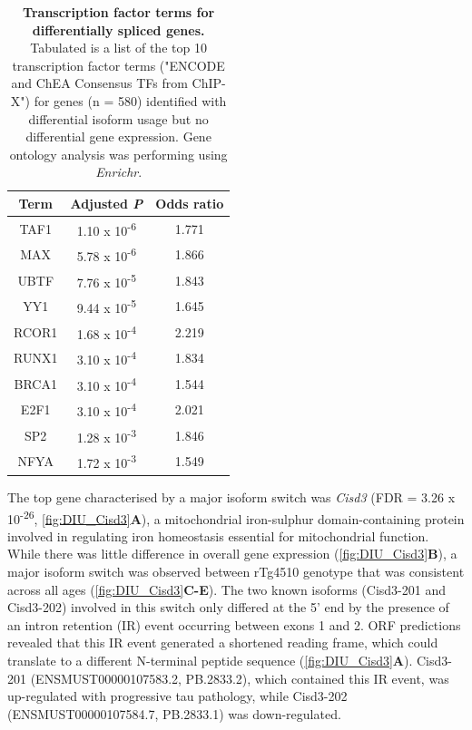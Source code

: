 \begin{table}[]
	\centering
	\captionsetup{width=0.95\textwidth,singlelinecheck=off}
	\caption[Transcription factor terms for differentially spliced genes]%
	{\textbf{Transcription factor terms for differentially spliced genes.} Tabulated is a list of the top 10 transcription factor terms ("ENCODE and ChEA Consensus TFs from ChIP-X") for genes (n = 580) identified with differential isoform usage but no differential gene expression. Gene ontology analysis was performing using \textit{Enrichr}.}
	\label{tab: df_enrichr}
	\begin{tabular}{@{}ccc@{}}
		\toprule
		Term   & Adjusted \textit{P} & Odds ratio \\ \midrule
		TAF1   & 1.10 x 10\textsuperscript{-6}         & 1.771      \\
		MAX    & 5.78 x 10\textsuperscript{-6}         & 1.866      \\
		UBTF   & 7.76 x 10\textsuperscript{-5}          & 1.843      \\
		YY1    & 9.44 x 10\textsuperscript{-5}          & 1.645      \\
		RCOR1  & 1.68 x 10\textsuperscript{-4}         & 2.219      \\
		RUNX1  & 3.10 x 10\textsuperscript{-4}         & 1.834      \\
		BRCA1  & 3.10 x 10\textsuperscript{-4}         & 1.544      \\
		E2F1   & 3.10 x 10\textsuperscript{-4}         & 2.021      \\
		SP2    & 1.28 x 10\textsuperscript{-3}          & 1.846      \\
		NFYA   & 1.72 x 10\textsuperscript{-3}          & 1.549      \\ \bottomrule
	\end{tabular}
\end{table}

The top gene characterised by a major isoform switch was \textit{Cisd3} (FDR = 3.26 x 10\textsuperscript{-26}, \cref{fig:DIU_Cisd3}\textbf{A}), a mitochondrial iron-sulphur domain-containing protein involved in regulating iron homeostasis essential for mitochondrial function\cite{Wiley2007}. While there was little difference in overall gene expression (\cref{fig:DIU_Cisd3}\textbf{B}), a major isoform switch was observed between rTg4510 genotype that was consistent across all ages (\cref{fig:DIU_Cisd3}\textbf{C-E}). The two known isoforms (Cisd3-201 and Cisd3-202) involved in this switch only differed at the 5' end by the presence of an intron retention (IR) event occurring between exons 1 and 2. ORF predictions revealed that this IR event generated a shortened reading frame, which could translate to a different N-terminal peptide sequence (\cref{fig:DIU_Cisd3}\textbf{A}). Cisd3-201 (ENSMUST00000107583.2, PB.2833.2), which contained this IR event, was up-regulated with progressive tau pathology, while Cisd3-202 (ENSMUST00000107584.7, PB.2833.1) was down-regulated.  

